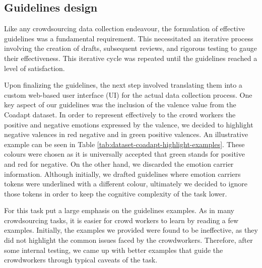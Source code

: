 \subsection{Guidelines design}
Like any crowdsourcing data collection endeavour, the formulation of effective guidelines was a fundamental requirement. This necessitated an iterative process involving the creation of drafts, subsequent reviews, and rigorous testing to gauge their effectiveness. This iterative cycle was repeated until the guidelines reached a level of satisfaction.

Upon finalizing the guidelines, the next step involved translating them into a custom web-based user interface (UI) for the actual data collection process. One key aspect of our guidelines was the inclusion of the valence value from the Coadapt dataset. In order to represent effectively to the crowd workers the positive and negative emotions expressed by the valence, we decided to highlight negative valences in red negative and in green positive valences. An illustrative example can be seen in Table \ref{tab:dataset-coadapt-highlight-examples}. These colours were chosen as it is universally accepted that green stands for positive and red for negative. On the other hand, we discarded the emotion carrier information. Although initially, we drafted guidelines where emotion carriers tokens were underlined with a different colour, ultimately we decided to ignore those tokens in order to keep the cognitive complexity of the task lower.

For this task put a large emphasis on the guidelines examples. As in many crowdsourcing tasks, it is easier for crowd workers to learn by reading a few examples. Initially, the examples we provided were found to be ineffective, as they did not highlight the common issues faced by the crowdworkers. Therefore, after some internal testing, we came up with better examples that guide the crowdworkers through typical caveats of the task.

